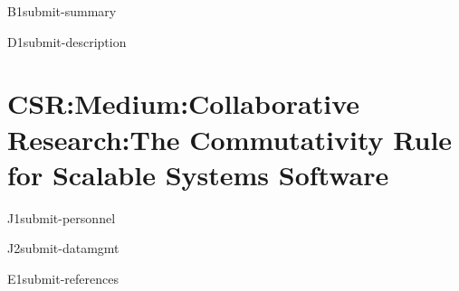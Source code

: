 \documentclass[11pt]{article}
\newcommand{\proptitle}{CSR:Medium:Collaborative Research:The
Commutativity Rule for Scalable Systems Software}
\begin{document}


\pagestyle{plain}

\begin{submit}{B}{1}{submit-summary}

\end{submit}


\begin{submit}{D}{1}{submit-description}

\section*{\proptitle{}}



%








\end{submit}

% 

\begin{submit}{J}{1}{submit-personnel}

\end{submit}

\begin{submit}{J}{2}{submit-datamgmt}

\end{submit}

% 

% 

\begin{submit}{E}{1}{submit-references}
{

\renewcommand{\refname}{\hbox to0pt{E\hss}\phantom{0}\quad References Cited}
\raggedright

\setlength{\bibsep}{0pt}


}
\end{submit}
\end{document}
